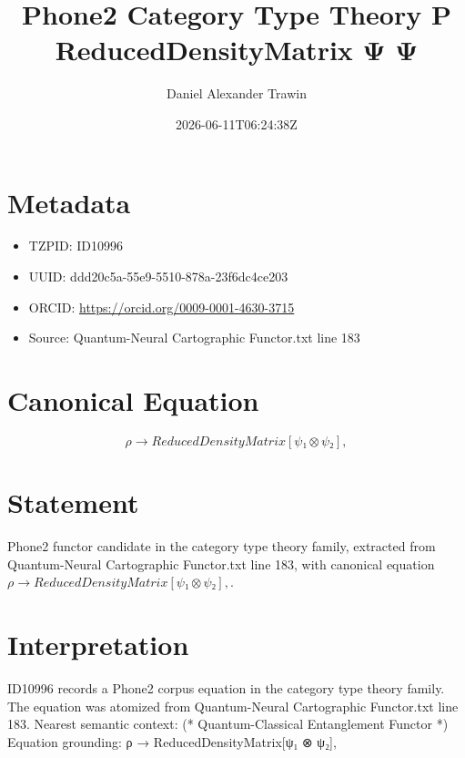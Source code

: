 \documentclass[11pt]{article}
\title{Phone2 Category Type Theory Ρ ReducedDensityMatrix Ψ Ψ}
\author{Daniel Alexander Trawin}
\date{2026-06-11T06:24:38Z}
\begin{document}
\maketitle
\section*{Metadata}
\begin{itemize}
\item TZPID: ID10996
\item UUID: ddd20c5a-55e9-5510-878a-23f6dc4ce203
\item ORCID: \url{https://orcid.org/0009-0001-4630-3715}
\item Source: Quantum-Neural Cartographic Functor.txt line 183
\end{itemize}
\section*{Canonical Equation}
\[
ρ → ReducedDensityMatrix[ψ₁ ⊗ ψ₂],
\]
\section*{Statement}
Phone2 functor candidate in the category type theory family, extracted from Quantum-Neural Cartographic Functor.txt line 183, with canonical equation $ρ → ReducedDensityMatrix[ψ₁ ⊗ ψ₂],$.
\section*{Interpretation}
ID10996 records a Phone2 corpus equation in the category type theory family. The equation was atomized from Quantum-Neural Cartographic Functor.txt line 183. Nearest semantic context: (* Quantum-Classical Entanglement Functor *) Equation grounding: ρ → ReducedDensityMatrix[ψ₁ ⊗ ψ₂],
\end{document}
